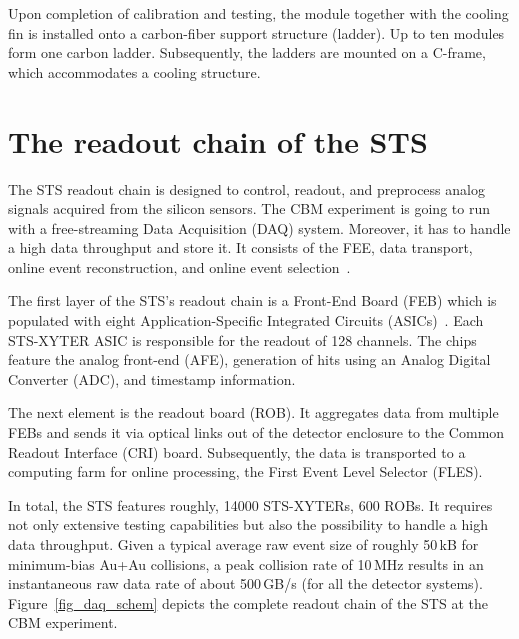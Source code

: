 Upon completion of calibration and testing, the module together with the cooling fin is installed onto a carbon-fiber support structure (ladder). Up to ten modules form one carbon ladder. Subsequently, the ladders are mounted on a C-frame, which accommodates a cooling structure. 
\section{The readout chain of the STS}
\label{readout}
\label{DAQ}
The \gls{STS} readout chain is designed to control, readout, and preprocess analog signals acquired from the silicon sensors. The \gls{CBM} experiment is going to run with a free-streaming Data Acquisition (\gls{DAQ}) system. Moreover, it has to handle a high data throughput and store it. It consists of the \gls{FEE}, data transport, online event reconstruction, and online event selection~\cite{Kasinski1}.

The first layer of the \gls{STS}'s readout chain is a Front-End Board (\gls{FEB}) which is populated with eight Application-Specific Integrated Circuits (ASICs)~\cite{Kasinski2}. Each STS-XYTER ASIC is responsible for the readout of 128 channels. The chips feature the analog front-end (\gls{AFE}), generation of hits using an Analog Digital Converter (\gls{ADC}), and timestamp information. 

The next element is the readout board (\gls{ROB}). It aggregates data from multiple \glspl{FEB} and sends it via optical links out of the detector enclosure to the Common Readout Interface (\gls{CRI}) board. Subsequently, the data is transported to a computing farm for online processing, the First Event Level Selector (FLES). 

In total, the \gls{STS} features roughly, 14000 STS-XYTERs, 600 \glspl{ROB}. It requires not only extensive testing capabilities but also the possibility to handle a high data throughput. Given a typical average raw event size of roughly 50\,kB for minimum-bias Au+Au collisions, a peak collision rate of 10\,MHz results in an instantaneous raw data rate of about 500\,GB/s (for all the detector systems). Figure~\ref{fig_daq_schem} depicts the complete readout chain of the \gls{STS} at the \gls{CBM} experiment. 

